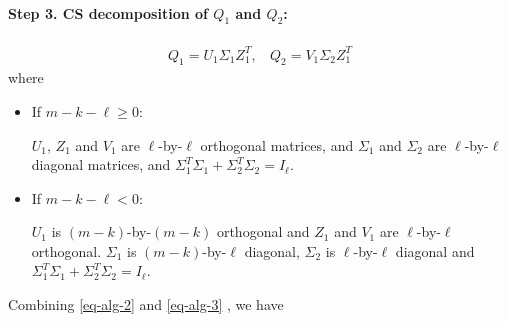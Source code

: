\paragraph{Step 3. CS decomposition of $Q_1$ and $Q_2$:}

\begin{align} \label{eq-alg-3}
Q_1 = U_1\Sigma_{1}Z_1^{T}, \ \ \ \ 
Q_2 = V_1\Sigma_{2}Z_1^{T}
\end{align}
where
\begin{itemize}
\item If $m-k-\ell \geq 0$:

$U_{1}$, $Z_{1}$ and $V_{1}$ are $\ell$-by-$\ell$ orthogonal
matrices, and $\Sigma_{1}$ and $\Sigma_{2}$ are $\ell$-by-$\ell$ diagonal matrices,
and $\Sigma_{1}^{T}\Sigma_{1} + \Sigma_{2}^{T}\Sigma_{2} = I_{\ell}$.

\item If $m-k-\ell < 0$:

$U_{1}$ is $(m-k)$-by-$(m-k)$ orthogonal and 
$Z_{1}$ and $V_{1}$ are $\ell$-by-$\ell$ orthogonal. 
$\Sigma_{1}$ is $(m-k)$-by-$\ell$ diagonal, 
$\Sigma_{2}$ is $\ell$-by-$\ell$ diagonal 
and $\Sigma_{1}^{T}\Sigma_{1} + \Sigma_{2}^{T}\Sigma_{2} = I_{\ell}$.
\end{itemize}

Combining \eqref{eq-alg-2} and \eqref{eq-alg-3} , we have


